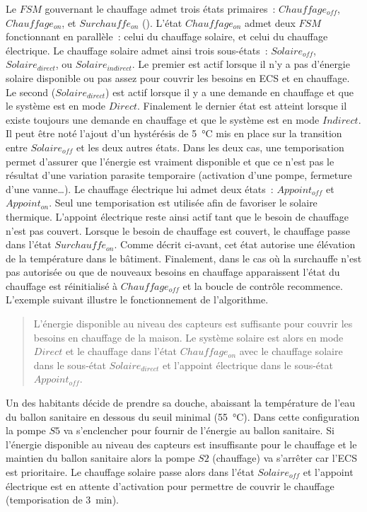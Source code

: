 Le $FSM$ gouvernant le chauffage admet trois états primaires~: $Chauffage_{off}$,
$Chauffage_{on}$, et $Surchauffe_{on}$ (). L’état
$Chauffage_{on}$ admet deux $FSM$ fonctionnant en parallèle~: celui du chauffage
solaire, et celui du chauffage électrique. Le chauffage solaire admet ainsi trois sous-états~:
$Solaire_{off}$, $Solaire_{direct}$, ou $Solaire_{indirect}$. Le premier est actif lorsque
il n’y a pas d’énergie solaire disponible ou pas assez pour couvrir les besoins en ECS et
en chauffage. Le second ($Solaire_{direct}$) est actif lorsque il y a une demande en
chauffage et que le système est en mode $Direct$. Finalement le dernier état est atteint
lorsque il existe toujours une demande en chauffage et que le système est en mode
$Indirect$.
Il peut être noté l’ajout d’un hystérésis de \SI{5}{\celsius} mis en place sur la
transition entre $Solaire_{off}$ et les deux autres états. Dans les deux cas, une
temporisation permet d’assurer que l’énergie est vraiment disponible et que ce n’est pas
le résultat d’une variation parasite temporaire (activation d’une pompe, fermeture d’une
vanne\dots). Le chauffage électrique lui admet deux états~: $Appoint_{off}$ et
$Appoint_{on}$. Seul une temporisation est utilisée afin de favoriser le solaire thermique.
L’appoint électrique reste ainsi actif tant que le besoin de chauffage n’est pas couvert.
Lorsque le besoin de chauffage est couvert, le chauffage passe dans l’état
$Surchauffe_{on}$. Comme décrit ci-avant, cet état autorise une élévation de la température
dans le bâtiment. Finalement, dans le cas où la surchauffe n’est pas autorisée ou que de nouveaux
besoins en chauffage apparaissent l’état du chauffage est réinitialisé à $Chauffage_{off}$
et la boucle de contrôle recommence.
L’exemple suivant illustre le fonctionnement de l’algorithme.
\blockquote{L’énergie disponible au niveau des capteurs est suffisante pour couvrir les besoins en chauffage de
la maison. Le système solaire est alors en mode $Direct$ et le chauffage dans l’état
$Chauffage_{on}$ avec le chauffage solaire dans le sous-état $Solaire_{direct}$ et
l’appoint électrique dans le sous-état $Appoint_{off}$.}
Un des habitants décide de prendre sa douche, abaissant la température de l’eau du ballon
sanitaire en dessous du seuil minimal (\SI{55}{\celsius}). Dans cette configuration la
pompe $S5$ va s’enclencher pour fournir de l’énergie au ballon sanitaire. Si l’énergie
disponible au niveau des capteurs est insuffisante pour le chauffage et le maintien du
ballon sanitaire alors la pompe $S2$ (chauffage) va s’arrêter car l’ECS est prioritaire.
Le chauffage solaire passe alors dans l’état $Solaire_{off}$ et l’appoint électrique est
en attente d’activation pour permettre de couvrir le chauffage (temporisation de
\SI{3}{\minute}).

